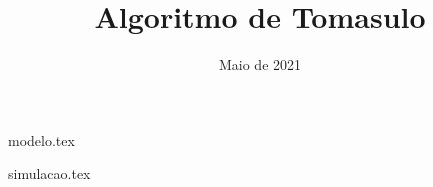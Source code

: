 \documentclass[aspectratio=169]{beamer}
\title{Algoritmo de Tomasulo}
\date{Maio de 2021}
\begin{document}
    \begin{frame}

    \titlepage

    \end{frame}

    {modelo.tex}

    {simulacao.tex}

\end{document}

